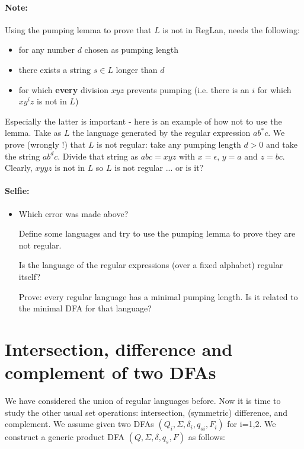 \paragraph{Note:} Using the pumping lemma to prove that $L$ is not
in RegLan, needs the following:
\begin{itemize}
\item for any number $d$ chosen as pumping length
\item there exists a string $s \in L$ longer than $d$
\item for which {\bf every} division $xyz$ prevents pumping
  (i.e. there is an $i$ for which $xy^iz$ is not in $L$)
\end{itemize}

Especially the latter is important - here is an example of how not to
use the lemma. Take as $L$ the language generated by the regular
expression $ab^*c$.  We prove (wrongly !) that $L$ is not regular:
take any pumping length $d > 0$ and take the string $ab^dc$. Divide that
string as $abc = xyz$ with $x = \epsilon$, $y = a$ and $z =
bc$. Clearly, $xyyz$ is not in $L$ so $L$ is not regular ... or is it?

\paragraph{Selfie:}
\begin{itemize}
\item[]
Which error was made above?

Define some languages and try to use the pumping lemma to prove they
are not regular.

Is the language of the regular expressions (over a fixed alphabet)
regular itself?

Prove: every regular language has a minimal pumping length. Is it
related to the minimal DFA for that language?
\end{itemize}


\section{Intersection, difference and complement of two DFAs}

We have considered the union of regular languages before. Now it is
time to study the other usual set operations: intersection,
(symmetric) difference, and complement. We assume given two DFAs
$(Q_i,\Sigma,\delta_i,q_{si},F_i)$ for i=1,2. We construct a generic
product DFA $(Q,\Sigma,\delta,q_s,F)$ as follows:


